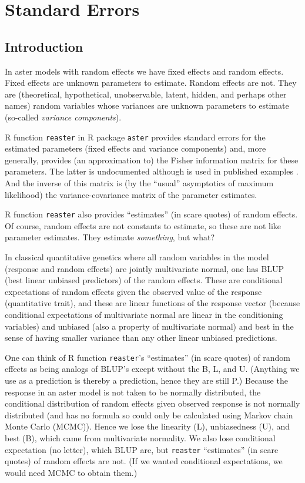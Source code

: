 \documentclass[11pt]{article}
\let\code=\texttt
\begin{document}
\section{Standard Errors}

\subsection{Introduction}

In aster models with random effects \citep*{reaster} we have fixed effects
and random effects.  Fixed effects are unknown parameters to estimate.
Random effects are not.  They are (theoretical, hypothetical, unobservable,
latent, hidden, and perhaps other names) random variables whose variances are
unknown parameters to estimate (so-called \emph{variance components}).

R function \code{reaster} in R package \code{aster} \citep{aster-package}
provides standard errors for the estimated parameters (fixed effects and
variance components) and, more generally, provides (an approximation to)
the Fisher information matrix for these parameters.  The latter is
undocumented although is used in published examples
\citep[Supplementary material Section~12.3.1]{zenodo}.  And the inverse
of this matrix is (by the ``usual'' asymptotics of maximum likelihood)
the variance-covariance matrix of the parameter estimates.

R function \code{reaster} also provides ``estimates'' (in scare quotes)
of random effects.  Of course, random effects are not constants to estimate,
so these are not like parameter estimates.  They estimate \emph{something}, but
what?

In classical quantitative genetics where all random variables in the model
(response and random effects) are jointly multivariate normal, one has
BLUP (best linear unbiased predictors) of the random effects.  These
are conditional expectations of random effects given the observed value
of the response (quantitative trait), and these are linear functions
of the response vector (because conditional expectations of multivariate
normal are linear in the conditioning variables) and unbiased
(also a property of multivariate normal)
and best in the sense of having smaller variance than any other linear
unbiased predictions.

One can think of R function \code{reaster}'s ``estimates'' (in scare quotes)
of random effects as being analogs of BLUP's except without the B, L, and U.
(Anything we use as a prediction is thereby a prediction, hence they are
still P.)
Because the response in an aster model is not taken to be normally distributed,
the conditional distribution of random effects given observed response is
not normally distributed (and has no formula so could only be calculated
using Markov chain Monte Carlo (MCMC)).  Hence we lose the linearity (L),
unbiasedness (U), and best (B), which came from multivariate normality.
We also lose conditional expectation (no letter), which BLUP are,
but \code{reaster} ``estimates'' (in scare quotes) of random effects are not.
(If we wanted conditional expectations, we would need MCMC to obtain them.)
\end{document}
